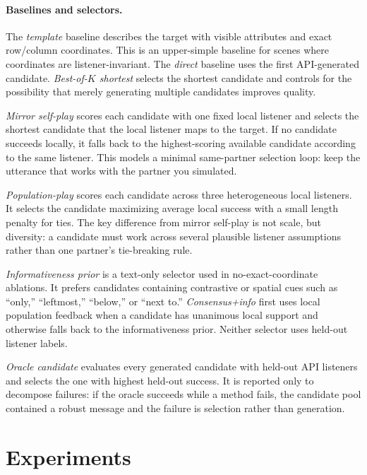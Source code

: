 \documentclass[10pt]{article}
\begin{document}
\paragraph{Baselines and selectors.}
The \emph{template} baseline describes the target with visible attributes and exact row/column coordinates. This is an upper-simple baseline for scenes where coordinates are listener-invariant. The \emph{direct} baseline uses the first API-generated candidate. \emph{Best-of-$K$ shortest} selects the shortest candidate and controls for the possibility that merely generating multiple candidates improves quality.

\emph{Mirror self-play} scores each candidate with one fixed local listener and selects the shortest candidate that the local listener maps to the target. If no candidate succeeds locally, it falls back to the highest-scoring available candidate according to the same listener. This models a minimal same-partner selection loop: keep the utterance that works with the partner you simulated.

\emph{Population-play} scores each candidate across three heterogeneous local listeners. It selects the candidate maximizing average local success with a small length penalty for ties. The key difference from mirror self-play is not scale, but diversity: a candidate must work across several plausible listener assumptions rather than one partner's tie-breaking rule.

\emph{Informativeness prior} is a text-only selector used in no-exact-coordinate ablations. It prefers candidates containing contrastive or spatial cues such as ``only,'' ``leftmost,'' ``below,'' or ``next to.'' \emph{Consensus+info} first uses local population feedback when a candidate has unanimous local support and otherwise falls back to the informativeness prior. Neither selector uses held-out listener labels.

\emph{Oracle candidate} evaluates every generated candidate with held-out API listeners and selects the one with highest held-out success. It is reported only to decompose failures: if the oracle succeeds while a method fails, the candidate pool contained a robust message and the failure is selection rather than generation.
\section{Experiments}
\end{document}
